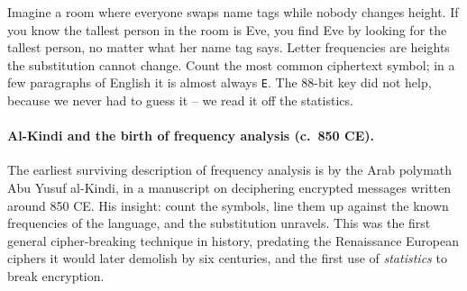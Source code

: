 \begin{intuitionbox}
Imagine a room where everyone swaps name tags while nobody changes
height. If you know the tallest person in the room is Eve, you find Eve by looking for the
tallest person, no matter what her name tag says. Letter frequencies are heights the substitution
cannot change. Count the most common ciphertext symbol; in a few paragraphs of English it is
almost always \texttt{E}. The $88$-bit key did not help, because we never had to guess it --
we read it off the statistics.
\end{intuitionbox}

\paragraph{Al-Kindi and the birth of frequency analysis (c.~850 CE).} The earliest surviving description of frequency
analysis is by the Arab polymath Abu Yusuf al-Kindi, in a manuscript on deciphering encrypted
messages written around 850 CE. His insight: count the symbols, line them up against the known
frequencies of the language, and the substitution unravels. This was the
first general cipher-breaking technique in history, predating the Renaissance European ciphers
it would later demolish by six centuries, and the first use of \emph{statistics} to break encryption.

